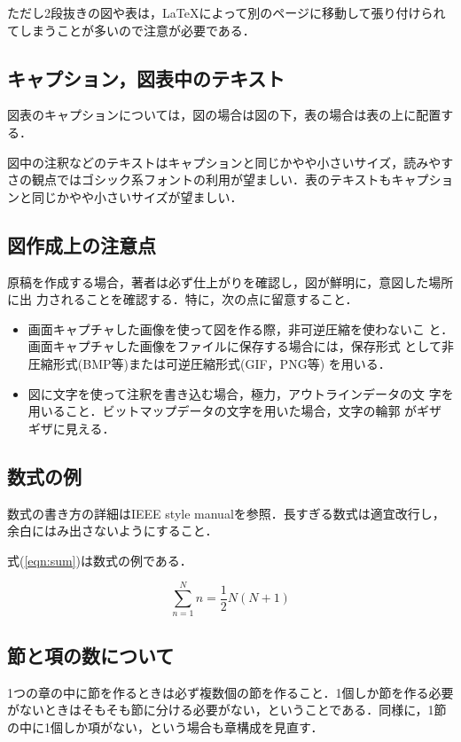 \documentclass[twoside]{wiss}
\begin{document}
ただし2段抜きの図や表は，\LaTeX によって別のページに移動して張り付けられ
てしまうことが多いので注意が必要である．

\subsection{キャプション，図表中のテキスト}
図表のキャプションについては，図の場合は図の下，表の場合は表の上に配置する．

図中の注釈などのテキストはキャプションと同じかやや小さいサイズ，読みやすさの観点ではゴシック系フォントの利用が望ましい．表のテキストもキャプションと同じかやや小さいサイズが望ましい．

\subsection{図作成上の注意点}
原稿を作成する場合，著者は必ず仕上がりを確認し，図が鮮明に，意図した場所に出
力されることを確認する．特に，次の点に留意すること．
\begin{itemize}

 \item 画面キャプチャした画像を使って図を作る際，非可逆圧縮を使わないこ
       と．画面キャプチャした画像をファイルに保存する場合には，保存形式
       として非圧縮形式(BMP等)または可逆圧縮形式(GIF，PNG等) を用いる．

 \item 図に文字を使って注釈を書き込む場合，極力，アウトラインデータの文
       字を用いること．ビットマップデータの文字を用いた場合，文字の輪郭
       がギザギザに見える．
\end{itemize}

\subsection{数式の例}
数式の書き方の詳細はIEEE style manual\cite{IEEE2014}を参照．長すぎる数式は適宜改行し，余白にはみ出さないようにすること．

式(\ref{eqn:sum})は数式の例である．

\begin{equation}
\sum^{N}_{n=1}n = \frac{1}{2}N(N+1)
\label{eqn:sum}
\end{equation}

\subsection{節と項の数について}
1つの章の中に節を作るときは必ず複数個の節を作ること．1個しか節を作る必要がないときはそもそも節に分ける必要がない，ということである．同様に，1節の中に1個しか項がない，という場合も章構成を見直す．
\end{document}
